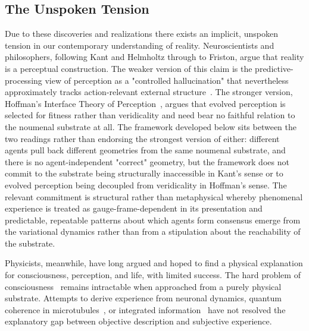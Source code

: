 \documentclass[11pt]{article}
\begin{document}
\subsection{The Unspoken Tension}

Due to these discoveries and realizations there exists an implicit, unspoken tension in our contemporary understanding of reality. Neuroscientists and philosophers, following Kant and Helmholtz through to Friston, argue that reality is a perceptual construction. The weaker version of this claim is the predictive-processing view of perception as a "controlled hallucination" that nevertheless approximately tracks action-relevant external structure~\cite{Clark2016, Seth2021}. The stronger version, Hoffman's Interface Theory of Perception~\cite{Hoffman2019}, argues that evolved perception is selected for fitness rather than veridicality and need bear no faithful relation to the noumenal substrate at all. The framework developed below sits between the two readings rather than endorsing the strongest version of either: different agents pull back different geometries from the same noumenal substrate, and there is no agent-independent "correct" geometry, but the framework does not commit to the substrate being structurally inaccessible in Kant's sense or to evolved perception being decoupled from veridicality in Hoffman's sense. The relevant commitment is structural rather than metaphysical whereby phenomenal experience is treated as gauge-frame-dependent in its presentation and predictable, repeatable patterns about which agents form consensus emerge from the variational dynamics rather than from a stipulation about the reachability of the substrate.

Physicists, meanwhile, have long argued and hoped to find a physical explanation for consciousness, perception, and life, with limited success. The hard problem of consciousness~\cite{Chalmers1995} remains intractable when approached from a purely physical substrate. Attempts to derive experience from neuronal dynamics, quantum coherence in microtubules~\cite{HameroffPenrose1996}, or integrated information~\cite{Tononi2008} have not resolved the explanatory gap between objective description and subjective experience.
\end{document}
